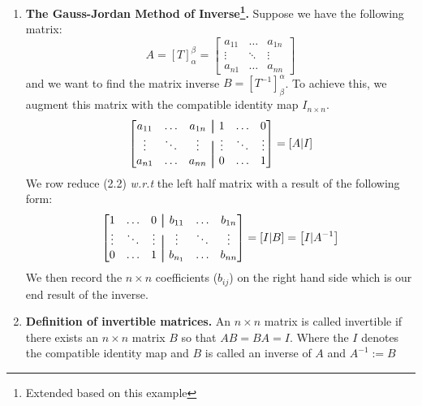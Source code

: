 \documentclass[oneside, 12pt]{book}
\newcommand{\settag}[1]{\renewcommand{\theenumi}{#1}}
\newcommand{\tbf}[1]{\textbf{#1}}
\newcommand{\aug}{\fboxsep=-\fboxrule\!\!\!\fbox{\strut}\!\!\!}
\newcommand{\para}[1]{\item \tbf{#1}}
\begin{document}
\begin{enumerate}
    \settag{2.6.9}
    \para{The Gauss-Jordan Method of Inverse\footnote{Extended based on this example}.} Suppose we have the following matrix:
    \begin{equation*}
    A = \left[T\right]_\alpha^\beta = 
        \begin{bmatrix}
            a_{11} & \hdots & a_{1n} \\
            \vdots & \ddots & \vdots \\
            a_{n1} & \ldots & a_{nn}
        \end{bmatrix}
    \end{equation*}
    and we want to find the matrix inverse $B = \left[T^{-1}\right]_\beta^\alpha$. To achieve this, we augment this matrix with the compatible identity map $I_{n\times n}$.
    \begin{equation}
        \begin{bmatrix}
            a_{11} & \hdots & a_{1n} &\aug & 1 & \ldots & 0 \\
            \vdots & \ddots & \vdots &\aug & \vdots & \ddots & \vdots \\
            a_{n1} & \ldots & a_{nn} &\aug & 0 & \ldots & 1
        \end{bmatrix} 
        = \left[A|I\right]
    \end{equation}
    We row reduce (2.2) \textit{w.r.t} the left half matrix with a result of the following form:
    \begin{equation*}
        \begin{bmatrix}
            1 & \ldots & 0 &\aug & b_{11} & \hdots & b_{1n}  \\
            \vdots & \ddots & \vdots &\aug & \vdots & \ddots & \vdots \\
            0 & \ldots & 1 &\aug & b_{n_1} & \ldots & b_{nn}
        \end{bmatrix} 
        = \left[I|B\right] = \left[I|A^{-1}\right]
    \end{equation*}
    We then record the $n\times n$ coefficients ($b_{ij}$) on the right hand side which is our end result of the inverse.
    
    \settag{2.6.10}
    \para{Definition of invertible matrices.} An $n \times n $ matrix is called invertible if there exists an $n\times n$ matrix $B$ so that $AB = BA = I$. Where the $I$ denotes the compatible identity map and $B$ is called an inverse of $A$ and $A^{-1} := B$
    

\end{enumerate}
\end{document}
